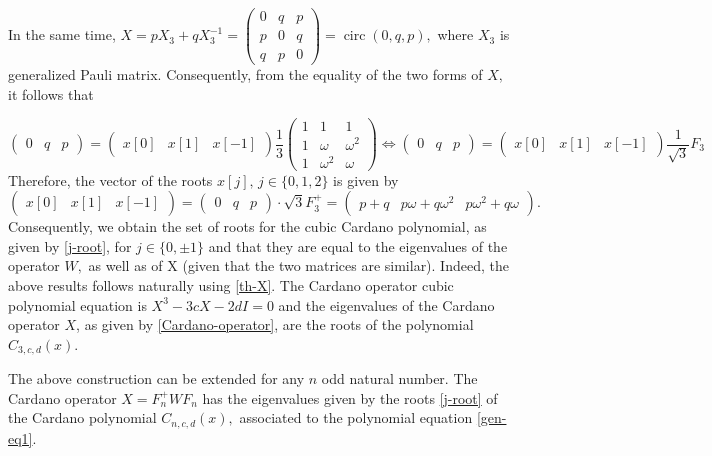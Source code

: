 \documentclass[11pt,reqno]{amsart}
\newcommand{\circM}{\operatorname{circ}}
\begin{document}
In the same time, $X=pX_3+qX_3^{-1}=\begin{pmatrix}
    0&q&p\\p&0&q\\q&p&0
\end{pmatrix}=\circM(0,q,p),$
where $X_3$ is generalized Pauli matrix. Consequently,  from the equality of the two forms of $X,$ it follows that

\begin{equation}
    \begin{pmatrix}
        0&q&p
    \end{pmatrix}=\begin{pmatrix}
       x[0]&x[1]&x[-1]
    \end{pmatrix}\frac{1}{3}\begin{pmatrix}
        1&1&1\\1&\omega&\omega^2\\1&\omega^2&\omega
    \end{pmatrix} \Leftrightarrow \begin{pmatrix}
        0&q&p
    \end{pmatrix}=\begin{pmatrix}
       x[0]&x[1]&x[-1]
    \end{pmatrix}\frac{1}{\sqrt{3}}F_3
\end{equation}
Therefore, the vector of the roots $x[j],\, j \in\{0,1,2\}$ is given by
\begin{equation}
    \begin{pmatrix}
        x[0]&x[1]&x[-1]
    \end{pmatrix}=\begin{pmatrix}
        0&q&p
    \end{pmatrix}\cdot \sqrt{3}F_3^{+}=\begin{pmatrix}
    p+q&p\omega+q\omega^2&p\omega^2+q\omega
    \end{pmatrix}.
\end{equation}
Consequently, we obtain the set of roots for the cubic Cardano  polynomial, as given by \eqref{j-root}, for $j\in\{0,\pm1\}$ and that they are equal to the eigenvalues of the operator $W,$ as well as of X (given that the two matrices are  similar).
Indeed, the above results follows naturally using \eqref{th-X}.  The Cardano operator cubic polynomial equation is $X^3-3cX-2dI=0 $ and  the eigenvalues of the Cardano operator  $X$, as given by \eqref{Cardano-operator}, are the roots of the polynomial $C_{3,c,d}(x).$ 
\par The above construction can be extended for any $n$ odd natural number.  The Cardano operator $X=F_n^+WF_n$ has the eigenvalues given by the roots \eqref{j-root} of the Cardano polynomial $C_{n,c,d}(x),$ associated to the polynomial equation \eqref{gen-eq1}.
\end{document}
